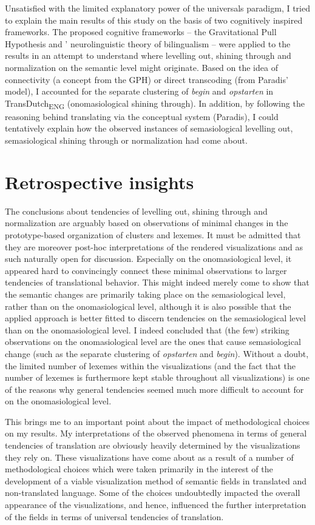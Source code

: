Unsatisfied with the limited explanatory power of the universals paradigm, I tried to explain the main results of this study on the basis of two cognitively inspired frameworks. The proposed cognitive frameworks – the Gravitational Pull Hypothesis and \citeauthor{paradis_language_1980}’ neurolinguistic theory of bilingualism – were applied to the results in an attempt to understand where levelling out, shining through and normalization on the semantic level might originate. Based on the idea of connectivity (a concept from the GPH) or direct transcoding (from Paradis’ model), I accounted for the separate clustering of \textit{begin} and \textit{opstarten} in TransDutch\textsubscript{ENG} (onomasiological shining through). In addition, by following the reasoning behind translating via the conceptual system (Paradis), I could tentatively explain how the observed instances of semasiological levelling out, semasiological shining through or normalization had come about.

\section{Retrospective insights}
\label{sec:6.2}  
The conclusions about tendencies of levelling out, shining through and normalization are arguably based on observations of minimal changes in the prototype-based organization of clusters and lexemes. It must be admitted that they are moreover post-hoc interpretations of the rendered visualizations and as such naturally open for discussion. Especially on the onomasiological level, it appeared hard to convincingly connect these minimal observations to larger tendencies of translational behavior. This might indeed merely come to show that the semantic changes are primarily taking place on the semasiological level, rather than on the onomasiological level, although it is also possible that the applied approach is better fitted to discern tendencies on the semasiological level than on the onomasiological level. I indeed concluded that (the few) striking observations on the onomasiological level are the ones that cause semasiological change (such as the separate clustering of \textit{opstarten} and \textit{begin}). Without a doubt, the limited number of lexemes within the visualizations (and the fact that the number of lexemes is furthermore kept stable throughout all visualizations) is one of the reasons why general tendencies seemed much more difficult to account for on the onomasiological level.

This brings me to an important point about the impact of methodological choices on my results. My interpretations of the observed phenomena in terms of general tendencies of translation are obviously heavily determined by the visualizations they rely on. These visualizations have come about as a result of a number of methodological choices which were taken primarily in the interest of the development of a viable visualization method of semantic fields in translated and non-translated language. Some of the choices undoubtedly impacted the overall appearance of the visualizations, and hence, influenced the further interpretation of the fields in terms of universal tendencies of translation.


